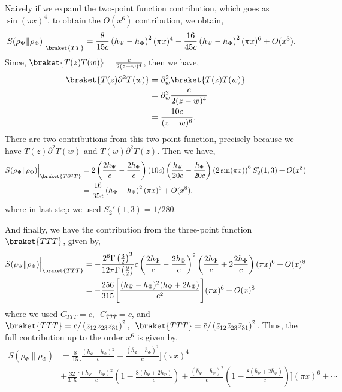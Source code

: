\documentclass[11pt]{article}
\newcommand{\p}{\partial}
\newcommand{\nn}{\nonumber}
\newcommand{\lb}{\left(}
\newcommand{\rb}{\right)}
\begin{document}
Naively if we expand the two-point function contribution, which goes as $\sin(\pi x)^4$, to obtain the $O(x^6)$ contribution, we obtain,
\begin{align}
    S(\rho_\Psi \| \rho_\Phi)\Big|_{\braket{TT}}&= \frac{8}{15c}\lb h_\Psi - h_\Phi\rb^2(\pi x)^4 -\frac{16}{45c}\lb h_\Psi - h_\Phi\rb^2(\pi x)^6 + O(x^8).
\end{align}
Since, $\braket{T(z)T(w)} = \frac{c}{2(z-w)^4}$, then we have,
\begin{align}
    \braket{T(z)\p^2T(w)} &= \p^2_w \braket{T(z)T(w)} \\
    &= \p^2_w \frac{c}{2(z-w)^4}\\
    &=\frac{10c}{(z-w)^6}.
\end{align}
There are two contributions from this two-point function, precisely because we have $T(z)\p^2T(w)$ and $T(w) \p^2T(z)$. Then we have,
\begin{align}
    S(\rho_\Psi \| \rho_\Phi) \Big|_{\braket{T\p^2T}} &= 2 \lb \frac{2h_\Psi}{c}-\frac{2h_\Phi}{c}\rb \lb 10c\rb \lb \frac{h_\Psi}{20c} - \frac{h_\Phi}{20c}\rb \lb2\sin (\pi x)\rb^6 S_2'(1,3) + O(x^8)\\
    &= \frac{16}{35c}\lb h_\Psi - h_\Phi\rb^2 (\pi x)^6 + O(x^8).
\end{align}
where in last step we used $S_2'(1,3) = 1/280$. 

And finally, we have the contribution from the three-point function $\braket{TTT}$, given by,
\begin{align}
    S(\rho_\Psi\|\rho_\Phi)\Big|_{\braket{TTT}} &= -\frac{2^{6}\Gamma\lb \frac{3}{2}\rb^3}{12\pi \Gamma\lb\frac{9}{2}\rb} c\lb\frac{2h_\Psi}{c}-\frac{2h_\Phi}{c}\rb^2\lb\frac{2h_\Psi}{c} + 2\frac{2h_\Phi}{c}\rb(\pi x)^6 + O(x)^8\\
    &= -\frac{256}{315}\Bigg[
\frac{(h_\Psi-h_\Phi)^2(h_\Psi+2h_\Phi)}{c^2}
\Bigg](\pi x)^6+ O(x)^8
\end{align}
where we used $C_{TTT} = c, \, \, \, C_{\bar{T}\bar{T}\bar{T}} = \bar c$, and $\braket{TTT} = c/\lb z_{12}z_{23}z_{31}\rb^2, \, \, \, \braket{\bar T\bar T\bar T} = \bar c/ \lb\bar z_{12} \bar z_{23}\bar z_{31}\rb^2$. 
Thus, the full contribution up to the order $x^6$ is given by,
\begin{align}
    S(\rho_\Psi\|\rho_\Phi)
&=  \frac{8}{15}
\Bigg[
\frac{(h_\Psi-h_\Phi)^2}{c} 
+\frac{(\bar h_\Psi-\bar h_\Phi)^2}{\bar c}
\Bigg]
(\pi x)^4 \nn \\&
+\frac{32}{315} \Bigg[
\frac{(h_\Psi - h_\Phi)^2}{c} \lb 1- \frac{8(h_\Psi +2 h_\Phi)}{c}\rb + \frac{(\bar h_\Psi - \bar h_\Phi)^2}{\bar c} \lb 1- \frac{8(\bar h_\Psi +2 \bar h_\Phi)}{\bar c}\rb
\Bigg](\pi x)^6 + \cdots
\end{align}
\end{document}
